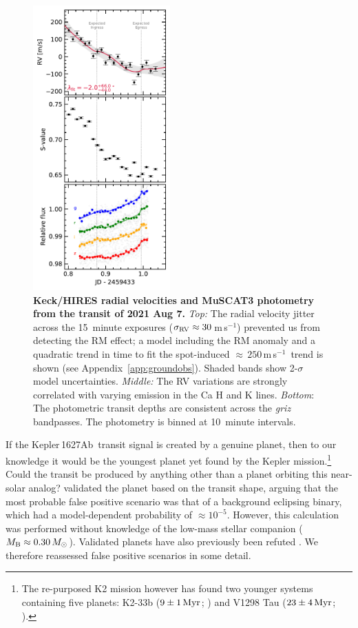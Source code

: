 \documentclass[12pt,modern,twocolumn,tighten,linenumbers]{aastex63}
\newcommand{\pn}{Kepler\,1627Ab} %
\newcommand{\ms}{\,m\,s$^{-1}$}
\begin{document}
\begin{figure}[tp]
	\begin{center}
		\leavevmode
		\includegraphics[width=0.47\textwidth]{f7.pdf}
	\end{center}
	\vspace{-0.7cm}
	\caption{
		{\bf Keck/HIRES radial velocities and MuSCAT3 photometry from the transit of 2021 Aug 7.}
		{\it Top:} 
		The radial velocity jitter across the 15~minute exposures
		($\sigma_{\rm RV}\approx30$\ms) prevented us from detecting the RM
		effect;
		a model including the RM anomaly and a quadratic trend in time to
		fit the spot-induced $\approx$\,$250$\ms\ trend is shown (see
		Appendix~\ref{app:groundobs}).  Shaded bands show 2-$\sigma$ model
		uncertainties.  
		{\it Middle:} The RV variations are strongly correlated with varying
		emission in the Ca H and K lines.
		{\it Bottom}: The photometric transit depths are consistent across
		the {\it griz} bandpasses. The photometry is binned at 10~minute
		intervals.
		\label{fig:ground}
	}
\end{figure}

If the \pn\ transit signal is created by a genuine planet,  then to
our knowledge it would be the youngest planet yet found by the
 Kepler mission.\footnote{The re-purposed K2 mission however has found
two younger systems containing five planets: K2-33b ($9\pm1\,{\rm
Myr}$; \citealt{Mann_K2_33b_2016,David_et_al_2017}) and V1298 Tau
($23\pm4\,{\rm Myr}$; \citealt{david_four_2019}).}   Could the transit
be produced by anything other than a planet orbiting this near-solar
analog?  \citet{morton_false_2016} validated the planet based on the
transit shape, arguing that the most probable false positive scenario
was that of a background eclipsing binary, which had a model-dependent
probability of $\approx$$10^{-5}$.  However, this calculation was
performed without knowledge of the low-mass stellar companion ($M_{\rm
B}\approx 0.30\,M_\odot$).  Validated planets have also previously
been refuted \citep[{\it e.g.},][]{shporer_three_2017}.  We therefore
reassessed false positive scenarios in some detail. 
\end{document}
